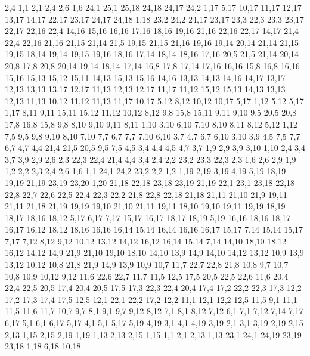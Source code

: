 2,4
%
1,1
2,1
2,4
2,6
1,6
24,1
25,1
25,18
24,18
24,17
24,2
%
1,17
5,17
10,17
11,17
12,17
13,17
14,17
22,17
23,17
24,17
24,18
1,18
%
23,2
24,2
24,17
23,17
23,3
%
22,3
23,3
23,17
22,17
22,16
22,4
%
14,16
15,16
16,16
17,16
18,16
19,16
21,16
22,16
22,17
14,17
%
21,4
22,4
22,16
21,16
21,15
21,14
21,5
%
19,15
21,15
21,16
19,16
%
19,14
20,14
21,14
21,15
19,15
%
18,14
19,14
19,15
19,16
18,16
%
17,14
18,14
18,16
17,16
%
20,5
21,5
21,14
20,14
20,8
%
17,8
20,8
20,14
19,14
18,14
17,14
%
16,8
17,8
17,14
17,16
16,16
%
15,8
16,8
16,16
15,16
15,13
15,12
15,11
%
14,13
15,13
15,16
14,16
%
13,13
14,13
14,16
14,17
13,17
%
12,13
13,13
13,17
12,17
%
11,13
12,13
12,17
11,17
%
11,12
15,12
15,13
14,13
13,13
12,13
11,13
%
10,12
11,12
11,13
11,17
10,17
%
5,12
8,12
10,12
10,17
5,17
%
1,12
5,12
5,17
1,17
%
8,11
9,11
15,11
15,12
11,12
10,12
8,12
%
9,8
15,8
15,11
9,11
9,10
%
9,5
20,5
20,8
17,8
16,8
15,8
9,8
%
8,10
9,10
9,11
8,11
%
1,10
3,10
6,10
7,10
8,10
8,11
8,12
5,12
1,12
%
7,5
9,5
9,8
9,10
8,10
7,10
7,7
%
6,7
7,7
7,10
6,10
%
3,7
4,7
6,7
6,10
3,10
3,9
%
4,5
7,5
7,7
6,7
4,7
%
4,4
21,4
21,5
20,5
9,5
7,5
4,5
%
3,4
4,4
4,5
4,7
3,7
%
1,9
2,9
3,9
3,10
1,10
%
2,4
3,4
3,7
3,9
2,9
2,6
%
2,3
22,3
22,4
21,4
4,4
3,4
2,4
%
2,2
23,2
23,3
22,3
2,3
%
1,6
2,6
2,9
1,9
%
1,2
2,2
2,3
2,4
2,6
1,6
%
1,1
24,1
24,2
23,2
2,2
1,2
1,19
2,19
3,19
4,19
5,19
18,19
19,19
21,19
23,19
23,20
1,20
%
21,18
22,18
23,18
23,19
21,19
%
22,1
23,1
23,18
22,18
22,8
22,7
22,6
22,5
22,4
22,3
22,2
%
21,8
22,8
22,18
21,18
21,11
21,10
21,9
%
19,11
21,11
21,18
21,19
19,19
%
19,10
21,10
21,11
19,11
%
18,10
19,10
19,11
19,19
18,19
18,17
18,16
18,12
%
5,17
6,17
7,17
15,17
16,17
18,17
18,19
5,19
%
16,16
18,16
18,17
16,17
%
16,12
18,12
18,16
16,16
16,14
%
15,14
16,14
16,16
16,17
15,17
%
7,14
15,14
15,17
7,17
%
7,12
8,12
9,12
10,12
13,12
14,12
16,12
16,14
15,14
7,14
%
14,10
18,10
18,12
16,12
14,12
%
14,9
21,9
21,10
19,10
18,10
14,10
%
13,9
14,9
14,10
14,12
13,12
%
10,9
13,9
13,12
10,12
%
10,8
21,8
21,9
14,9
13,9
10,9
%
10,7
11,7
22,7
22,8
21,8
10,8
%
9,7
10,7
10,8
10,9
10,12
9,12
%
11,6
22,6
22,7
11,7
%
11,5
12,5
17,5
20,5
22,5
22,6
11,6
%
20,4
22,4
22,5
20,5
%
17,4
20,4
20,5
17,5
%
17,3
22,3
22,4
20,4
17,4
%
17,2
22,2
22,3
17,3
%
12,2
17,2
17,3
17,4
17,5
12,5
%
12,1
22,1
22,2
17,2
12,2
%
11,1
12,1
12,2
12,5
11,5
%
9,1
11,1
11,5
11,6
11,7
10,7
9,7
%
8,1
9,1
9,7
9,12
8,12
%
7,1
8,1
8,12
7,12
%
6,1
7,1
7,12
7,14
7,17
6,17
%
5,1
6,1
6,17
5,17
%
4,1
5,1
5,17
5,19
4,19
%
3,1
4,1
4,19
3,19
%
2,1
3,1
3,19
2,19
2,15
2,13
%
1,15
2,15
2,19
1,19
%
1,13
2,13
2,15
1,15
%
1,1
2,1
2,13
1,13
23,1
24,1
24,19
23,19
23,18
%
1,18
6,18
10,18
